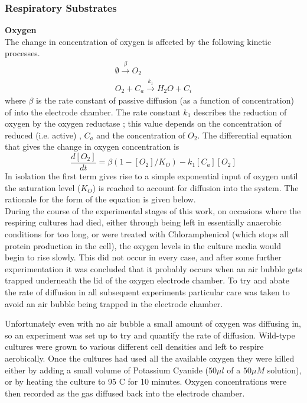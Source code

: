 \subsubsection{Respiratory Substrates}
{\bf Oxygen}\\
The change in concentration of oxygen is affected by the following kinetic processes.
\begin{equation*}
\begin{gathered}
\emptyset\xrightarrow{\beta} O_2\\
O_2 + C_a\xrightarrow{k_1} H_{2}O + C_i
\end{gathered}
\end{equation*}
where $\beta$ is the rate constant of passive diffusion (as a function of \cOxygen{} concentration) of \cOxygen{} into the electrode chamber. The rate constant $k_1$ describes the reduction of oxygen by the oxygen reductase \cbbthree{}; this value depends on the concentration of reduced (i.e. active) \cbbthree{}, $C_a$ and the concentration of $O_2$.
The differential equation that gives the change in oxygen concentration is
\begin{equation}
\frac{d[O_2]}{dt} = \beta(1-[O_2]/K_O) - k_{1}[C_a][O_2]
\label{eq:oxygen}
\end{equation}
In isolation the first term gives rise to a simple exponential input of oxygen until the saturation level ($K_O$) is reached to account for diffusion into the system. The rationale for the form of the equation is given below.\\
\noindent
During the course of the experimental stages of this work, on occasions where the respiring cultures had died, either through being left in essentially anaerobic conditions for too long, or were treated with Chloramphenicol (which stops all protein production in the cell), the oxygen levels in the culture media would begin to rise slowly. This did not occur in every case, and after some further experimentation it was concluded that it probably occurs when an air bubble gets trapped underneath the lid of the oxygen electrode chamber. To try and abate the rate of diffusion in all subsequent experiments particular care was taken to avoid an air bubble being trapped in the electrode chamber.

Unfortunately even with no air bubble a small amount of oxygen was diffusing in, so an experiment was set up to try and quantify the rate of diffusion. Wild-type \Nm{} cultures were grown to various different cell densities and left to respire aerobically. Once the cultures had used all the available oxygen they were killed either by adding a small volume of Potassium Cyanide ($50 \mu l$ of a $50 \mu M$ solution), or by heating the culture to 95 \textdegree{}C for 10 minutes. Oxygen concentrations were then recorded as the gas diffused back into the electrode chamber.%

